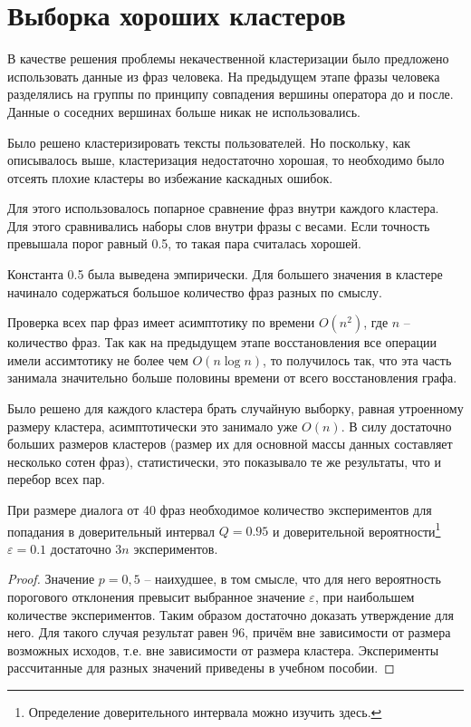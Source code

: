 \documentclass[times,specification,annotation]{itmo-student-thesis}
\begin{document}
	
	\section{Выборка хороших кластеров}
	В качестве решения проблемы некачественной кластеризации было предложено использовать данные из фраз человека. На предыдущем этапе фразы человека разделялись на группы по принципу совпадения вершины оператора до и после. Данные о соседних вершинах больше никак не использовались. 
	
	Было решено кластеризировать тексты пользователей. Но поскольку, как описывалось выше, кластеризация недостаточно хорошая, то необходимо было отсеять плохие кластеры во избежание каскадных ошибок.
	
	Для этого использовалось попарное сравнение фраз внутри каждого кластера. Для этого сравнивались наборы слов внутри фразы с весами. Если точность превышала порог равный 0.5, то такая пара считалась хорошей.
	
	Константа 0.5 была выведена эмпирически. Для большего значения в кластере начинало содержаться большое количество фраз разных по смыслу. 
	
	Проверка всех пар фраз имеет асимптотику по времени $O(n^2)$, где $n$ -- количество фраз. Так как на предыдущем этапе восстановления все операции имели ассимтотику не более чем $O(n \log n)$, то получилось так, что эта часть занимала значительно больше половины времени от всего восстановления графа. 
	
	Было решено для каждого кластера брать случайную выборку, равная утроенному размеру кластера, асимптотически это занимало уже $O(n)$. В силу достаточно больших размеров кластеров (размер их для основной массы данных составляет несколько сотен фраз), статистически, это показывало те же результаты, что и перебор всех пар.
	
	\begin{prop}
		При размере диалога от 40 фраз необходимое количество экспериментов для попадания в доверительный интервал $Q=0.95$ и доверительной вероятности\footnote{Определение доверительного интервала можно изучить здесь.\cite{чернова2007теория}} $\varepsilon=0.1$ достаточно $3n$ экспериментов.
	\end{prop}
	\begin{proof}
		Значение $p=0,5$ -- наихудшее, в том смысле, что для него вероятность порогового отклонения превысит выбранное значение $\varepsilon$, при наибольшем количестве экспериментов. Таким образом достаточно доказать утверждение для него. Для такого случая результат равен 96, причём вне зависимости от размера возможных исходов, т.е. вне зависимости от размера кластера. Эксперименты рассчитанные для разных значений приведены в учебном пособии.\cite{мухинмоделирование}
	\end{proof}
	
\end{document}
